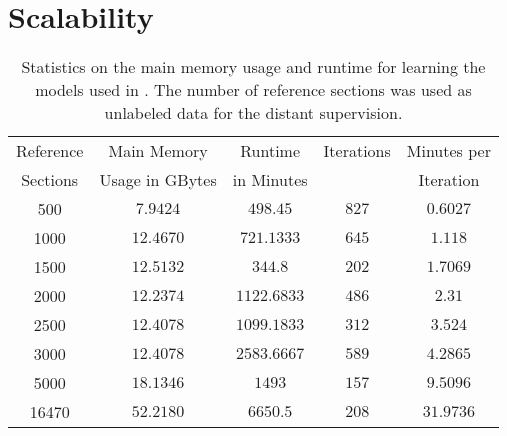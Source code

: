 \section{Scalability}\label{app:scalability}

\begin{table}[h]
\centering
\begin{tabular}{c c c c c}
 \toprule
 Reference & Main Memory  & Runtime & Iterations& Minutes per\\
  Sections &  Usage in GBytes &  in Minutes& &Iteration\\
 \midrule
 \hphantom{00}\num{500} &  \hphantom{0}$7.9424$ &\hphantom{0}$498.45$\hphantom{00} & $827$ &\hphantom{0}$0.6027$\\
 \hphantom{0}\num{1000}&  $12.4670$&\hphantom{0}$721.1333$ &$645$&\hphantom{0}$1.118$\hphantom{0}\\
 \hphantom{0}\num{1500} &  $12.5132$&\hphantom{0}$344.8$\hphantom{000}  &$202$ &\hphantom{0}$1.7069$ \\
 \hphantom{0}\num{2000} &  $12.2374$&$1122.6833$&$486$&\hphantom{0}$2.31$\hphantom{00}\\
 \hphantom{0}\num{2500} &  $12.4078$&$1099.1833$&$312$&\hphantom{0}$3.524$\hphantom{0}\\
 \hphantom{0}\num{3000} &  $12.4078$&$2583.6667$&$589$&\hphantom{0}$4.2865$\\
 \hphantom{0}\num{5000} &  $18.1346$&$1493$\hphantom{.0000}  &$157$  &\hphantom{0}$9.5096$ \\
 \num{16470}&  $52.2180$&$6650.5$\hphantom{000}  &$208$ &$31.9736$\\
 \bottomrule
\end{tabular}
\caption{Statistics on the main memory usage and runtime for learning the models used in . The number of reference sections was used as unlabeled data for the distant supervision.}
\label{tab:ssoar-number-of-tags}
\end{table}


